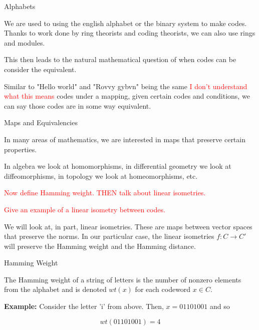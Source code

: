 \documentclass{beamer}
\begin{document}
\begin{frame}{Alphabets}

    We are used to using the english alphabet or the binary system to make codes. Thanks to work done
    by ring theorists and coding theorists, we can also use rings and modules.

    \bigskip

    \pause

    This then leads to the natural mathematical question of when codes can be consider the equivalent.

    \medskip

    Similar to "Hello world" and "Rovvy gybvn" being the same \textcolor{red}{I don't understand what this means}  codes under a mapping, given certain codes
    and conditions, we can say those codes are in some way equivalent.
    
\end{frame}

\begin{frame}{Maps and Equivalencies}
    
    In many areas of mathematics, we are interested in maps that preserve certain properties.

    \medskip

    In algebra we look at homomorphisms, in differential geometry we look at diffeomorphisms, in
    topology we look at homeomorphisms, etc.

    \bigskip

    \pause
    
    
    
    \textcolor{red}{Now define Hamming weight. THEN talk about linear isometries.}
    
    
    \textcolor{red}{Give an example of a linear isometry between codes.}
    

    


    We will look at, in part, linear isometries. These are maps between vector spaces that preserve the
    norms. In our particular case, the linear isometries $f:C\to C'$ will preserve the Hamming weight
    and the Hamming distance.
    
        

\end{frame}

\begin{frame}{Hamming Weight}
    
    The Hamming weight of a string of letters is the number of nonzero elements from the alphabet and is
    denoted $wt(x)$ for each codeword $x\in C$.

    \medskip

    \pause

    \textbf{Example:} Consider the letter 'i' from above. Then, $x=01101001$ and so

    $$wt(01101001)=4$$

\end{frame}
\end{document}
